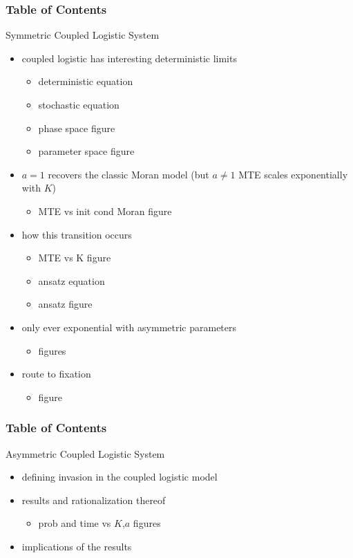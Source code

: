\documentclass[8pt]{beamer}
\begin{document}
\begin{frame}
\frametitle{Table of Contents}
Symmetric Coupled Logistic System
	\begin{itemize}
		\item coupled logistic has interesting deterministic limits
		\begin{itemize}
			\item deterministic equation
			\item stochastic equation
			\item phase space figure
			\item parameter space figure
		\end{itemize}
		\item $a=1$ recovers the classic Moran model (but $a\neq 1$ MTE scales exponentially with $K$)
		\begin{itemize}
			\item MTE vs init cond Moran figure
		\end{itemize}
		\item how this transition occurs
		\begin{itemize}
			\item MTE vs K figure
			\item ansatz equation
			\item ansatz figure
		\end{itemize}
		\item only ever exponential with asymmetric parameters
		\begin{itemize}
			\item figures
		\end{itemize}
		\item route to fixation
		\begin{itemize}
			\item figure
		\end{itemize}
	\end{itemize}
\end{frame}


\begin{frame}
\frametitle{Table of Contents}
Asymmetric Coupled Logistic System
	\begin{itemize}
		\item defining invasion in the coupled logistic model
		\item results and rationalization thereof
		\begin{itemize}
			\item prob and time vs $K$,$a$ figures
		\end{itemize}
		\item implications of the results
	\end{itemize}
\end{frame}
\end{document}
